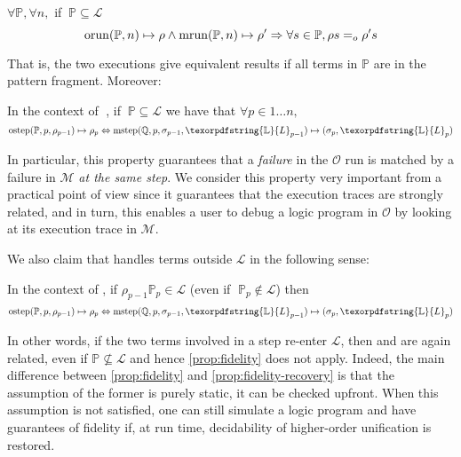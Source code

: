 \documentclass[sigconf,natbib=false,review]{acmart}
\newcommand{\EqualRel}{\ensuremath{=}}
\newcommand{\Eo}{\ensuremath{\EqualRel_o}\xspace}
\newcommand{\llambda}{\ensuremath{\mathcal{L}}\xspace}
\newcommand{\Fo}{\texorpdfstring{\ensuremath{\mathcal{O}\xspace}}{O}} %
\newcommand{\Ho}{\texorpdfstring{\ensuremath{\mathcal{M}}\xspace}{M}}
\newcommand{\linkStore}{\texorpdfstring{\ensuremath{\mathbb{L}}\xspace}{L}}
\newcommand{\foUnifPb}{\ensuremath{\mathbb{P}}\xspace}
\newcommand{\hoUnifPb}{\ensuremath{\mathbb{Q}}\xspace}
\begin{document}
\begin{proposition}\label{prop:simulation}
$\forall \foUnifPb, \forall n,$ if $~\foUnifPb \subseteq \llambda$
$$
  \runFx{\foUnifPb}{n}{\rho} \land
  \runHx{\foUnifPb}{n}{\rho'}
  \Rightarrow
  \forall s \in \foUnifPb, \rho s \Eo \rho' s
$$
\end{proposition}

\noindent
That is, the two executions give equivalent results if all terms in
\foUnifPb are in the pattern fragment. Moreover:

\begin{proposition}\label{prop:fidelity}
In the context of$\;$ \hrun, if $~\foUnifPb \subseteq \llambda$ we have that
$\forall p \in 1 \ldots n,$
$$
\stepF{\foUnifPb}{p}{\rho_{p-1}}{\rho_p}
\Leftrightarrow
\stepH{\hoUnifPb}{p}{\sigma_{p-1}}{\linkStore_{p-1}}{\sigma_p}{\linkStore_p}
$$
\end{proposition}
\noindent
In particular, this property guarantees that a \emph{failure} in the \Fo{} run
is matched by a failure in \Ho{} \emph{at the same step}. We consider this
property very important from a practical point of view since it guarantees
that the execution traces are strongly related, and in turn, this enables a user
to debug a logic program in \Fo{} by looking at its execution trace in
\Ho{}.

We also claim that \hrun handles terms outside \llambda in the following sense:

\begin{proposition}\label{prop:fidelity-recovery} 
In the context of \hrun, if 
$\rho_{p-1} \foUnifPb_{p} \in \llambda$ 
(even if $\;\foUnifPb_{p} \not\in \llambda$)
then
$$
\stepF{\foUnifPb}{p}{\rho_{p-1}}{\rho_p} \Leftrightarrow
\stepH{\hoUnifPb}{p}{\sigma_{p-1}}{\linkStore_{p-1}}{\sigma_{p}}{\linkStore_p}
$$
\end{proposition}

\noindent
In other words, if the two terms involved in a step
re-enter \llambda, then \hstep and \fstep are again related, even if
$\foUnifPb \not\subseteq \llambda$ and hence \cref{prop:fidelity} does not apply.
Indeed, the main difference between \cref{prop:fidelity} and \cref{prop:fidelity-recovery}
is that the assumption of the former is purely static, it can be checked upfront. 
When this assumption is not satisfied, one can still simulate a logic program and
have guarantees of fidelity if, at run time, decidability of higher-order
unification is restored.
\end{document}
